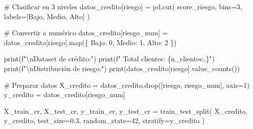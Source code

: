 \documentclass[
  doc,
  floatsintext,
  longtable,
  a4paper,
  nolmodern,
  notxfonts,
  notimes,
  12pt,
  colorlinks=true,linkcolor=blue,citecolor=blue,urlcolor=blue]{apa7}
\newenvironment{Shaded}{\begin{snugshade}}{\end{snugshade}}
\newcommand{\BuiltInTok}[1]{\textcolor[rgb]{0.00,0.23,0.31}{#1}}
\newcommand{\CharTok}[1]{\textcolor[rgb]{0.13,0.47,0.30}{#1}}
\newcommand{\CommentTok}[1]{\textcolor[rgb]{0.37,0.37,0.37}{#1}}
\newcommand{\DecValTok}[1]{\textcolor[rgb]{0.68,0.00,0.00}{#1}}
\newcommand{\FloatTok}[1]{\textcolor[rgb]{0.68,0.00,0.00}{#1}}
\newcommand{\NormalTok}[1]{\textcolor[rgb]{0.00,0.23,0.31}{#1}}
\newcommand{\OperatorTok}[1]{\textcolor[rgb]{0.37,0.37,0.37}{#1}}
\newcommand{\SpecialCharTok}[1]{\textcolor[rgb]{0.37,0.37,0.37}{#1}}
\newcommand{\SpecialStringTok}[1]{\textcolor[rgb]{0.13,0.47,0.30}{#1}}
\newcommand{\StringTok}[1]{\textcolor[rgb]{0.13,0.47,0.30}{#1}}
\begin{document}
\begin{Shaded}
\begin{Highlighting}[]
\CommentTok{\# Clasificar en 3 niveles}
\NormalTok{datos\_credito[}\StringTok{\textquotesingle{}riesgo\textquotesingle{}}\NormalTok{] }\OperatorTok{=}\NormalTok{ pd.cut(}
\NormalTok{    score\_riesgo,}
\NormalTok{    bins}\OperatorTok{=}\DecValTok{3}\NormalTok{,}
\NormalTok{    labels}\OperatorTok{=}\NormalTok{[}\StringTok{\textquotesingle{}Bajo\textquotesingle{}}\NormalTok{, }\StringTok{\textquotesingle{}Medio\textquotesingle{}}\NormalTok{, }\StringTok{\textquotesingle{}Alto\textquotesingle{}}\NormalTok{]}
\NormalTok{)}

\CommentTok{\# Convertir a numérico}
\NormalTok{datos\_credito[}\StringTok{\textquotesingle{}riesgo\_num\textquotesingle{}}\NormalTok{] }\OperatorTok{=}\NormalTok{ datos\_credito[}\StringTok{\textquotesingle{}riesgo\textquotesingle{}}\NormalTok{].}\BuiltInTok{map}\NormalTok{(\{}
    \StringTok{\textquotesingle{}Bajo\textquotesingle{}}\NormalTok{: }\DecValTok{0}\NormalTok{,}
    \StringTok{\textquotesingle{}Medio\textquotesingle{}}\NormalTok{: }\DecValTok{1}\NormalTok{,}
    \StringTok{\textquotesingle{}Alto\textquotesingle{}}\NormalTok{: }\DecValTok{2}
\NormalTok{\})}

\BuiltInTok{print}\NormalTok{(}\SpecialStringTok{f"}\CharTok{\textbackslash{}n}\SpecialStringTok{Dataset de crédito:"}\NormalTok{)}
\BuiltInTok{print}\NormalTok{(}\SpecialStringTok{f"  Total clientes: }\SpecialCharTok{\{}\NormalTok{n\_clientes}\SpecialCharTok{:,\}}\SpecialStringTok{"}\NormalTok{)}
\BuiltInTok{print}\NormalTok{(}\SpecialStringTok{f"}\CharTok{\textbackslash{}n}\SpecialStringTok{Distribución de riesgo:"}\NormalTok{)}
\BuiltInTok{print}\NormalTok{(datos\_credito[}\StringTok{\textquotesingle{}riesgo\textquotesingle{}}\NormalTok{].value\_counts())}

\CommentTok{\# Preparar datos}
\NormalTok{X\_credito }\OperatorTok{=}\NormalTok{ datos\_credito.drop([}\StringTok{\textquotesingle{}riesgo\textquotesingle{}}\NormalTok{, }\StringTok{\textquotesingle{}riesgo\_num\textquotesingle{}}\NormalTok{], axis}\OperatorTok{=}\DecValTok{1}\NormalTok{)}
\NormalTok{y\_credito }\OperatorTok{=}\NormalTok{ datos\_credito[}\StringTok{\textquotesingle{}riesgo\_num\textquotesingle{}}\NormalTok{]}

\NormalTok{X\_train\_cr, X\_test\_cr, y\_train\_cr, y\_test\_cr }\OperatorTok{=}\NormalTok{ train\_test\_split(}
\NormalTok{    X\_credito, y\_credito, test\_size}\OperatorTok{=}\FloatTok{0.3}\NormalTok{, random\_state}\OperatorTok{=}\DecValTok{42}\NormalTok{, stratify}\OperatorTok{=}\NormalTok{y\_credito}
\NormalTok{)}


\end{Highlighting}
\end{Shaded}
\end{document}
